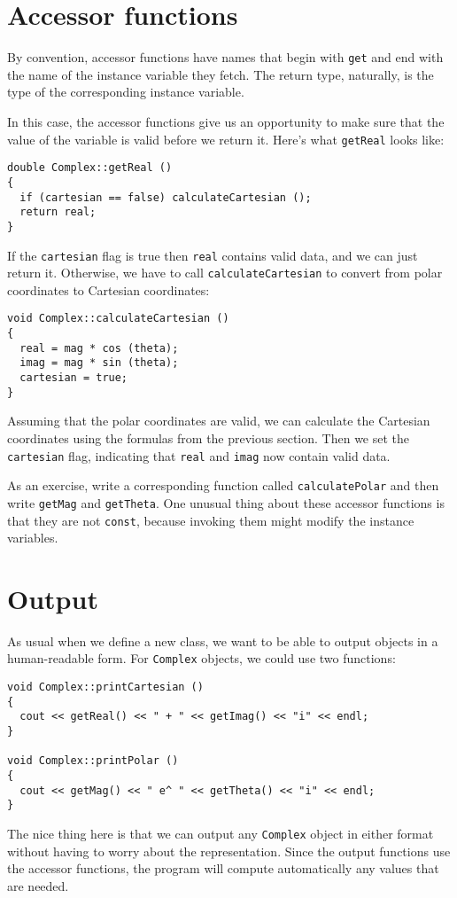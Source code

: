 \section{Accessor functions}

By convention, accessor functions have names that
begin with {\tt get} and end with the name of the instance
variable they fetch.  The return type, naturally, is the type
of the corresponding instance variable.


In this case, the accessor functions give us an opportunity
to make sure that the value of the variable is valid before
we return it.  Here's what {\tt getReal} looks like:

\begin{verbatim}
double Complex::getReal ()
{
  if (cartesian == false) calculateCartesian ();
  return real;
}
\end{verbatim}
%
If the {\tt cartesian} flag is true then {\tt real} contains
valid data, and we can just return it.  Otherwise, we have
to call {\tt calculateCartesian} to convert from polar coordinates
to Cartesian coordinates:

\begin{verbatim}
void Complex::calculateCartesian ()
{
  real = mag * cos (theta);
  imag = mag * sin (theta);
  cartesian = true;
}
\end{verbatim}
%
Assuming that the polar coordinates are valid, we
can calculate the Cartesian coordinates using the formulas
from the previous section.  Then we
set the {\tt cartesian} flag, indicating that {\tt real}
and {\tt imag} now contain valid data.

As an exercise, write a corresponding function called
{\tt calculatePolar} and then write {\tt getMag}
and {\tt getTheta}.  One unusual thing about these
accessor functions is that they are not {\tt const},
because invoking them might modify the instance variables.

\section{Output}

As usual when we define a new class, we want to be able to
output objects in a human-readable form.  For {\tt Complex}
objects, we could use two functions:

\begin{verbatim}
void Complex::printCartesian ()
{
  cout << getReal() << " + " << getImag() << "i" << endl;
}

void Complex::printPolar ()
{
  cout << getMag() << " e^ " << getTheta() << "i" << endl;
}
\end{verbatim}
%
The nice thing here is that we can output any {\tt Complex} object in
either format without having to worry about the representation.  Since
the output functions use the accessor functions, the program
will compute automatically any values that are needed.


